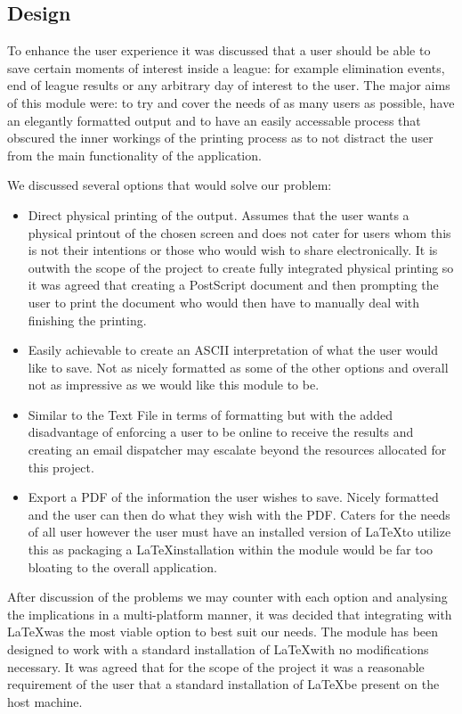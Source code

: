 \subsection{Design}
To enhance the user experience it was discussed that a user should be
able to save certain moments of interest inside a league: for example
elimination events, end of league results or any arbitrary day of
interest to the user. The major aims of this module were: to try and
cover the needs of as many users as possible, have an elegantly
formatted output and to have an easily accessable process that
obscured the inner workings of the printing process as to not distract
the user from the main functionality of the application.

We discussed several options that would solve our problem:
\begin{itemize}
  \item[Physical Printing] Direct physical printing of the
    output. Assumes that the user wants a physical printout of the
    chosen screen and does not cater for users whom this is not their
    intentions or those who would wish to share electronically. It is
    outwith the scope of the project to create fully integrated
    physical printing so it was agreed that creating a PostScript
    document and then prompting the user to print the document who
    would then have to manually deal with finishing the printing.
  \item[Text File] Easily achievable to create an ASCII interpretation
    of what the user would like to save. Not as nicely formatted as
    some of the other options and overall not as impressive as we
    would like this module to be.
  \item[Emailed results] Similar to the Text File in terms of
    formatting but with the added disadvantage of enforcing a user to
    be online to receive the results and creating an email dispatcher
    may escalate beyond the resources allocated for this project.
  \item[\LaTeX] Export a PDF of the information the user wishes to
    save. Nicely formatted and the user can then do what they wish
    with the PDF. Caters for the needs of all user however the user
    must have an installed version of \LaTeX to utilize this as
    packaging a \LaTeX installation within the module would be far too
    bloating to the overall application.
\end{itemize}
After discussion of the problems we may counter with each option and
analysing the implications in a multi-platform manner, it was decided
that integrating with \LaTeX was the most viable option to best suit
our needs. The module has been designed to work with a standard
installation of \LaTeX with no modifications necessary. It was agreed
that for the scope of the project it was a reasonable requirement of
the user that a standard installation of \LaTeX be present on the host
machine. 

